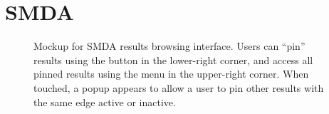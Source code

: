 \section{SMDA}

\begin{figure}[htb]
    \caption{\label{fig:smda-mock} Mockup for SMDA results browsing interface. Users can ``pin'' results using the button in the lower-right corner, and access all pinned results using the menu in the upper-right corner. When touched, a popup appears to allow a user to pin other results with the same edge active or inactive.}
\end{figure}

